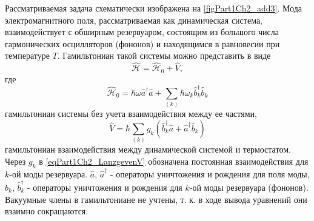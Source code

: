 Рассматриваемая задача схематически изображена на
\autoref{figPart1Ch2_add3}. Мода электромагнитного поля,
рассматриваемая как динамическая система, взаимодействует с обширным
резервуаром, состоящим из большого числа гармонических осцилляторов
(фононов) и находящимся в равновесии при температуре $T$. Гамильтониан
такой системы можно представить в виде
\begin{equation}
\hat{\mathcal{H}} = \hat{\mathcal{H}}_0 + \hat{V},
\nonumber
\end{equation}
где
\begin{equation}
 \hat{\mathcal{H}}_0 = \hbar\omega \hat{a}^{\dag}\hat{a} +
\sum_{(k)} \hbar\omega_k \hat{b}_k^{\dag} \hat{b}_k
\nonumber
\end{equation}
гамильтониан системы без учета взаимодействия между ее частями,
\begin{equation}
 \hat{V} = \hbar \sum_{(k)}g_k\left(
\hat{b}_k^{\dag}\hat{a} + \hat{a}^{\dag}\hat{b}_k
\right)
\label{eqPart1Ch2_LanzgevenV}
\end{equation}
гамильтониан взаимодействия между динамической системой и
термостатом. Через $g_k$ в \eqref{eqPart1Ch2_LanzgevenV} обозначена
постоянная взаимодействия для $k$-ой моды резервуара. $\hat{a}$,
$\hat{a}^{\dag}$ - операторы уничтожения и рождения для поля моды,
$\hat{b}_k$, $\hat{b}_{k}^{\dag}$ - операторы уничтожения и рождения для
$k$-ой моды резервуара (фононов). Вакуумные члены в гамильтониане не
учтены, т. к. в ходе вывода уравнений они взаимно сокращаются.

